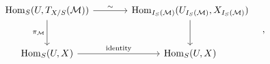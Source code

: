 \[
\begin{tikzcd}[column sep=large,row sep=large]
\operatorname{Hom}_S(U,T_{X/S}(\mathcal M)) \arrow[r,"\sim"] \arrow[d,"\pi_{\mathcal M}"'] & \operatorname{Hom}_{I_S(\mathcal M)}(U_{I_S(\mathcal M)},X_{I_S(\mathcal M)}) \arrow[d]\\
\operatorname{Hom}_S(U,X) \arrow[r,"\mathrm{identity}"] & \operatorname{Hom}_S(U,X)
\end{tikzcd}\quad ,
\]
